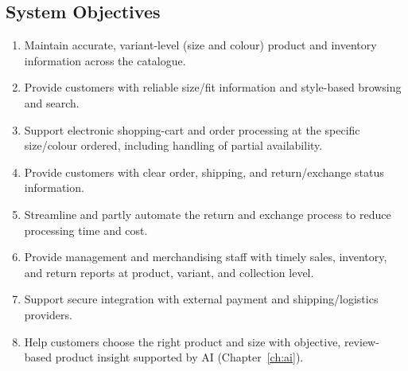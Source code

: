 \documentclass[11pt,a4paper,oneside]{extreport}
\newif\ifshowvtwo
\newcommand{\upd}[1]{\ifshowvtwo\textcolor{red}{#1}\else#1\fi}
\begin{document}
\subsection{System Objectives}
\label{subsec:objectives}
\begin{enumerate}[label=\textbf{O\arabic*.},leftmargin=1.1cm]
  \item Maintain accurate, variant-level (size and colour) product and inventory information across the catalogue.
  \item Provide customers with reliable size/fit information and style-based browsing and search.
  \item Support electronic shopping-cart and order processing at the specific size/colour ordered, including handling of partial availability.
  \item Provide customers with clear order, shipping, and return/exchange status information.
  \item Streamline and partly automate the return and exchange process to reduce processing time and cost.
  \item Provide management and merchandising staff with timely sales, inventory, and return reports at product, variant, and collection level.
  \item Support secure integration with external payment and shipping/logistics providers.
  \item \upd{Help customers choose the right product and size with objective, review-based product insight supported by AI (Chapter~\ref{ch:ai}).}
\end{enumerate}
\end{document}
